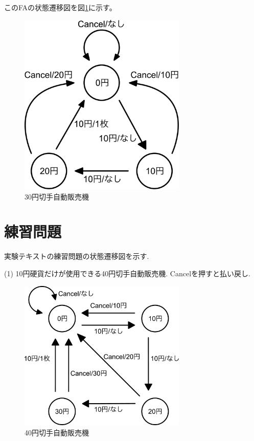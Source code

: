 \documentclass[titlepage]{jsarticle}
\begin{document}
        このFAの状態遷移図を図\ref{fig:例状態遷移図}に示す。

        \begin{figure}[ht]
            \centering
            \includegraphics[width=8cm]{images/rei.pdf}
            \caption{30円切手自動販売機}
            \label{fig:例状態遷移図}
        \end{figure}

\section{練習問題}
    実験テキストの練習問題の状態遷移図を示す.

    (1) 10円硬貨だけが使用できる40円切手自動販売機. Cancelを押すと払い戻し.

    \begin{figure}[ht]
        \centering
        \includegraphics[width=8cm]{images/40.pdf}
        \caption{40円切手自動販売機}
        \label{fig:40状態遷移図}
    \end{figure}
\end{document}

